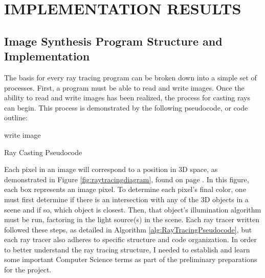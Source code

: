 %
%
%


\chapter{\uppercase {Implementation Results}}

\section{Image Synthesis Program Structure and Implementation}

The basis for every ray tracing program can be broken down into a simple set of processes.  First, a program must be able to read and write images.  Once the ability to read and write images has been realized, the process for casting rays can begin. This process is demonstrated by the following pseudocode, or code outline:

\begin{algorithm}[H]
\label{alg:RayTracingPseudocode}
write image\;
\caption{Ray Casting Pseudocode}
\end{algorithm}

Each pixel in an image will correspond to a position in 3D space, as demonstrated in Figure \ref{fig:raytracingdiagram}, found on page \pageref{fig:raytracingdiagram}. In this figure, each box represents an image pixel.  To determine each pixel's final color, one must first determine if there is an intersection with any of the 3D objects in a scene and if so, which object is closest.  Then, that object's illumination algorithm must be run, factoring in the light source(s) in the scene.  Each ray tracer written followed these steps, as detailed in Algorithm \ref{alg:RayTracingPseudocode}, but each ray tracer also adheres to specific structure and code organization.  In order to better understand the ray tracing structure, I needed to establish and learn some important Computer Science terms as part of the preliminary preparations for the project.

